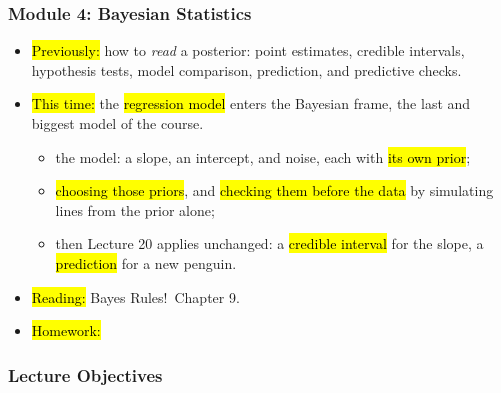 

\begin{frame}
\frametitle{Module 4: Bayesian Statistics}
    \begin{itemize}
        \item \hl{Previously:} how to \emph{read} a posterior: point estimates, credible intervals, hypothesis tests, model comparison, prediction, and predictive checks.
        \item \hl{This time:} the \hl{regression model} enters the Bayesian frame, the last and biggest model of the course.
          \begin{itemize}
              \item the model: a slope, an intercept, and noise, each with \hl{its own prior};
              \item \hl{choosing those priors}, and \hl{checking them before the data} by simulating lines from the prior alone;
              \item then Lecture 20 applies unchanged: a \hl{credible interval} for the slope, a \hl{prediction} for a new penguin.
          \end{itemize}
        \item \hl{Reading:} Bayes Rules!\ Chapter 9.
        \item \hl{Homework:}
    \end{itemize}
\end{frame}


\begin{frame}
    \frametitle{Lecture Objectives}
\end{frame}


